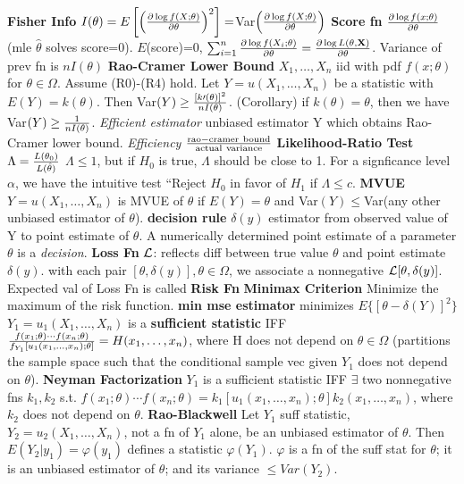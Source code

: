 {{\bf Fisher Info} $I(\theta)=E\left[\left({\partial \log f(X;\theta)\over \partial \theta}\right)^2\right] = $\rm Var$\left({\partial \log f(X;\theta)\over \partial \theta}\right)$\quad
{\bf Score fn} $\partial \log f(x;\theta) \over \partial \theta$ (mle $\hat \theta$ solves score=0). $E$(score)=0, $\sum_{i=1}^n{\partial \log{f(X_i;\theta)} \over \partial \theta} = {\partial \log L(\theta, {\bf X}) \over \partial \theta}$. Variance of prev fn is $n I(\theta)$\quad
{\bf Rao-Cramer Lower Bound} $X_1,\dots,X_n$ iid with pdf $f(x;\theta)$ for $\theta \in \Omega$. Assume (R0)-(R4) hold. Let $Y = u(X_1,\dots,X_n)$ be a statistic with $E(Y) = k(\theta)$. Then Var$(Y) \geq {[k\prime (\theta)]^2 \over nI(\theta)}$. (Corollary) if $k(\theta)=\theta$, then we have Var$(Y) \geq {1 \over nI(\theta)}$. {\it Efficient estimator} unbiased estimator Y which obtains Rao-Cramer lower bound. {\it Efficiency} ${\rm rao-cramer\ bound \over actual\ variance}$\quad 
{\bf Likelihood-Ratio Test} $\Lambda = {L(\theta_0) \over L(\hat \theta)}$ $\Lambda \leq 1$, but if $H_0$ is true, $\Lambda$ should be close to 1. For a signficance level $\alpha$, we have the intuitive test ``Reject $H_0$ in favor of $H_1$ if $\Lambda \leq c$.\quad
{\bf MVUE} $Y=u(X_1,\dots,X_n)$ is MVUE of $\theta$ if $E(Y)=\theta$ and Var$(Y) \leq $Var(any other unbiased estimator of $\theta$).
{\bf decision rule} $\delta(y)$ estimator from observed value of Y to point estimate of $\theta$. A numerically determined point estimate of a parameter $\theta$ is a {\it decision}.\quad
{\bf Loss Fn} $\cal L$: reflects diff between true value $\theta$ and point estimate $\delta(y)$. with each pair $[\theta,\delta(y)], \theta \in \Omega$, we associate a nonnegative ${\cal L}[\theta, \delta(y)]$. Expected val of Loss Fn is called {\bf Risk Fn}\quad
{\bf Minimax Criterion} Minimize the maximum of the risk function.
{\bf min mse estimator} minimizes $E\{[\theta - \delta(Y)]^2\}$\quad
$Y_1=u_1(X_1,\dots,X_n)$ is a {\bf sufficient statistic} IFF ${f(x_1;\theta)\cdots f(x_n;\theta) \over f_{Y_1}[u_1(x_1,\dots,x_n);\theta]} = H(x_1,\dots,x_n)$, where H does not depend on $\theta \in \Omega$ (partitions the sample space such that the conditional sample vec given $Y_1$ does not depend on $\theta$).\quad
{\bf Neyman Factorization} $Y_1$ is a sufficient statistic IFF $\exists$ two nonnegative fns $k_1,k_2$ s.t. $f(x_1;\theta)\cdots f(x_n;\theta) = k_1[u_1(x_1,\dots,x_n);\theta]k_2(x_1,\dots,x_n)$, where $k_2$ does not depend on $\theta$.\quad
{\bf Rao-Blackwell} Let $Y_1$ suff statistic, $Y_2=u_2(X_1,\dots,X_n)$, not a fn of $Y_1$ alone, be an unbiased estimator of $\theta$.  Then $E(Y_2|y_1) = \varphi(y_1)$ defines a statistic $\varphi(Y_1)$.  $\varphi$ is a fn of the suff stat for $\theta$; it is an unbiased estimator of $\theta$; and its variance $\leq Var(Y_2)$.\quad
}
